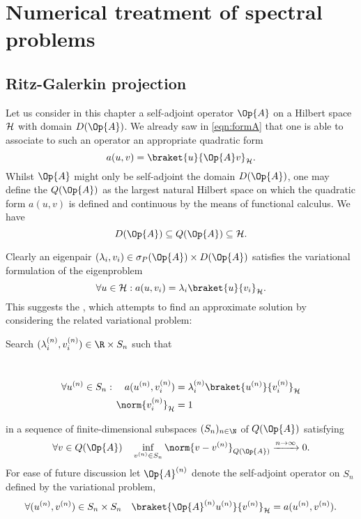 \chapter{Numerical treatment of spectral problems}
\label{ch:numeigen}


\section{Ritz-Galerkin projection}
\label{sec:RitzGalerkin}
Let us consider in this chapter a self-adjoint operator $\Op{A}$
on a Hilbert space $\mathcal{H}$ with domain $D(\Op{A})$.
We already saw in \eqref{eqn:formA} that one is able
to associate to such an operator an appropriate quadratic form
\[ a(u, v) = \braket{u}{\Op{A} v}_\hilbert. \]
Whilst $\Op{A}$ might only be self-adjoint the domain $D(\Op{A})$,
one may define the  $Q(\Op{A})$ as the largest
natural Hilbert space on which the quadratic form $a(u, v)$
is defined and continuous by the means of functional calculus.
We have
\[ D(\Op{A}) \subseteq Q(\Op{A}) \subseteq \hilbert. \]

Clearly an eigenpair $(\lambda_i, v_i) \in \sigma_P(\Op{A}) \times D(\Op{A})$
satisfies the variational formulation of the eigenproblem
\[ \forall u \in \hilbert: a(u, v_i) = \lambda_i \braket{u}{v_i}_\hilbert. \]
This suggests the ,
which attempts to find an approximate solution by considering
the related variational problem:
\begin{center}
\begin{minipage}{0.9\textwidth}
	Search $(\lambda_i^{(n)}, v_i^{(n)}) \in \R \times S_n$ such that
\end{minipage} \\[-1.3em]
\begin{align}
	\label{eqn:varProblem1}
	\forall u^{(n)} \in S_n: \quad a(u^{(n)}, v_i^{(n)})
		&= \lambda_i^{(n)} \braket{u^{(n)}}{v_i^{(n)}}_\hilbert \\
	\label{eqn:varProblem2}
	\norm{v_i^{(n)}}_\hilbert &= 1
\end{align}
\end{center}
in a sequence of finite-dimensional subspaces $(S_n)_{n\in\N}$
of $Q(\Op{A})$ satisfying
\begin{equation}
	\forall v \in Q(\Op{A}) \quad \inf_{v^{(n)} \in S_n} \norm{v - v^{(n)}}_{Q(\Op{A})} \xrightarrow{n\to \infty} 0.
	\label{eqn:CondSubspaces}
\end{equation}
For ease of future discussion let $\Op{A}^{(n)}$ denote the self-adjoint
operator on $S_n$ defined by the variational problem, \ie
\[ \forall (u^{(n)}, v^{(n)}) \in S_n \times S_n \quad \braket{\Op{A}^{(n)} u^{(n)}}{v^{(n)}}_\hilbert = a(u^{(n)}, v^{(n)}). \]

